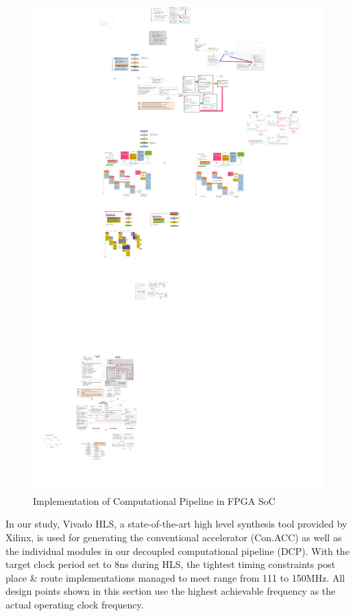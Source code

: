 \begin{figure}[htp]
\begin{center}
\includegraphics[width=0.7\linewidth]{chap3fig/ippf.pdf}
\caption{Implementation of Computational Pipeline in FPGA SoC  
\label{fig:ippf}}
\end{center}
\end{figure} 
In our study, Vivado HLS, a state-of-the-art high level synthesis tool provided by Xilinx,
is used for generating the conventional accelerator (Con.ACC) as well as the individual
modules in our decoupled computational pipeline (DCP). With the target clock period set to 
8ns during HLS, the tightest timing constraints post place \& route implementations managed to meet range from 111 to 150MHz. 
All design points shown in this section 
use the highest achievable frequency as the actual operating clock frequency. 

